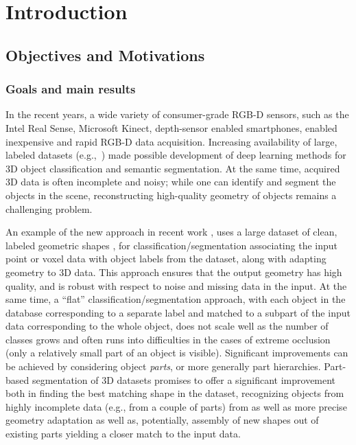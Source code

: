 
\chapter{Introduction}





\section{Objectives and Motivations}

\subsection{Goals and main results}


In the recent years, a wide variety of consumer-grade RGB-D sensors, such as the Intel Real Sense, Microsoft Kinect, depth-sensor enabled smartphones, enabled inexpensive and rapid RGB-D data acquisition. Increasing availability of large, labeled datasets (e.g.,~\cite{chang2017matterport3d,dai2017scannet})  made possible development of deep learning methods for 3D object classification and semantic segmentation. At the same time, acquired 3D data is often incomplete and noisy; while one can identify and segment the objects in the scene, reconstructing high-quality geometry of objects remains a challenging problem.  

An example of the new approach in recent work 
\cite{avetisyan2019scan2cad}, uses a large dataset of clean, labeled geometric shapes
\cite{chang2015shapenet}, for classification/segmentation associating the input point or voxel data with object labels from the dataset, along with adapting geometry to 3D data.  This approach ensures that the output geometry has high quality, and is robust with respect to noise and missing data in the input.  
At the same time, a ``flat'' classification/segmentation approach, with each object in the database corresponding to a separate label and matched to a subpart of the input data corresponding to the whole object, does not scale well as the number of classes grows and often runs into difficulties in the cases of extreme occlusion (only a relatively small part of an object is visible). 
Significant improvements can be achieved by considering object \emph{parts}, or more generally part hierarchies. 
Part-based segmentation of 3D datasets promises to offer a significant improvement both in finding the best matching shape in the dataset, recognizing objects from  highly incomplete data (e.g., from a couple of parts) from  as well as more precise geometry adaptation as well as, potentially, assembly of new shapes out of existing parts yielding a closer match to the input data. 

